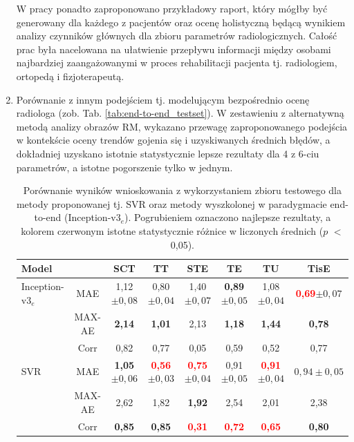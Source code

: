 \begin{enumerate}
 W pracy ponadto zaproponowano przykładowy raport, który mógłby być generowany dla każdego z pacjentów oraz ocenę holistyczną będącą wynikiem analizy czynników głównych dla zbioru parametrów radiologicznych. Całość prac była nacelowana na ułatwienie przepływu informacji między osobami najbardziej zaangażowanymi w proces rehabilitacji pacjenta tj. radiologiem, ortopedą i fizjoterapeutą.
 \item Porównanie z innym podejściem tj. modelującym bezpośrednio ocenę radiologa (zob. Tab. \ref{tab:end-to-end_testset}). W zestawieniu z alternatywną metodą analizy obrazów RM, wykazano przewagę zaproponowanego podejścia w kontekście oceny trendów gojenia się i uzyskiwanych średnich błędów, a dokładniej uzyskano istotnie statystycznie lepsze rezultaty dla 4 z 6-ciu parametrów, a istotne pogorszenie tylko w jednym.
 \vspace{0.5cm}
 \begin{table}[h!]
 	\caption{Porównanie wyników wnioskowania z wykorzystaniem zbioru testowego dla metody proponowanej tj. SVR oraz metody wyszkolonej w paradygmacie end-to-end (Inception-v3$_{e}$). Pogrubieniem oznaczono najlepsze rezultaty, a kolorem czerwonym istotne statystycznie różnice w liczonych średnich ($p$ $<$ 0,05).}
 	\vspace{-0.5cm}
 	\tiny
 	\begin{center}
 		\hspace*{2em}\begin{tabular}{lc||c|c|c|c|c|c}
 			\textbf{Model} & & \textbf{SCT} & \textbf{TT} & \textbf{STE} & \textbf{TE} & \textbf{TU} & \textbf{TisE}\\ \hline \hline
 			Inception-v3$_{e}$ & MAE & 1,12$\pm{0,08}$ & 0,80$\pm{0,04}$ & 1,40$\pm{0,07}$ & \textbf{0,89}$\pm{0,05}$ & 1,08$\pm{0,04}$ & \textcolor{red}{\textbf{0,69}}$\pm{0,07}$ \\
 			& MAX-AE & \textbf{2,14} & \textbf{1,01} & 2,13 & \textbf{1,18} & \textbf{1,44} & \textbf{0,78} \\
 			& Corr & 0,82 & 0,77 & 0,05 & 0,59 & 0,52 & 0,77 \\ \hline
 			SVR & MAE & \textbf{1,05}$\pm0,06$ & \textcolor{red}{\textbf{0,56}}$\pm0,03$ & \textcolor{red}{\textbf{0,75}}$\pm0,04$ & 0,91$\pm0,05$ & \textcolor{red}{\textbf{0,91}}$\pm0,04$ & $0,94\pm0,05$\\
 			& MAX-AE & 2,62 & 1,82 & \textbf{1,92} & 2,54 & 2,01 & 2,38 \\
 			& Corr & \textbf{0,85} & \textbf{0,85} & \textcolor{red}{\textbf{0,31}} & \textcolor{red}{\textbf{0,72}} & \textcolor{red}{\textbf{0,65}} & \textbf{0,80} 

\end{tabular}
\end{center}
\end{table}
\end{enumerate}
